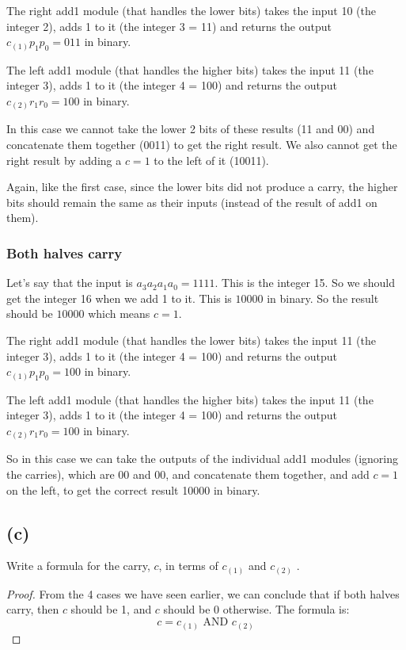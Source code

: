 \documentclass[14pt]{extarticle}
\begin{document}
The right add1 module (that handles the lower bits) takes the input 10 (the integer 2), adds 1 to it (the integer 3 = 11) and returns the output $c_{(1)}p_1p_0 = 011$ in binary.

The left add1 module (that handles the higher bits) takes the input 11 (the integer 3), adds 1 to it (the integer 4 = 100) and returns the output $c_{(2)}r_1r_0 = 100$ in binary.

In this case we cannot take the lower 2 bits of these results (11 and 00) and concatenate them together (0011) to get the right result. We also cannot get the right result by adding a $c = 1$ to the left of it (10011). 

Again, like the first case, since the lower bits did not produce a carry, the higher bits should remain the same as their inputs (instead of the result of add1 on them).

\subsubsection{Both halves carry}
Let's say that the input is $a_3a_2a_1a_0 = 1111$. This is the integer 15. So we should get the integer 16 when we add 1 to it. This is $10000$ in binary. So the result should be $10000$ which means $c = 1$.

The right add1 module (that handles the lower bits) takes the input 11 (the integer 3), adds 1 to it (the integer 4 = 100) and returns the output $c_{(1)}p_1p_0 = 100$ in binary.

The left add1 module (that handles the higher bits) takes the input 11 (the integer 3), adds 1 to it (the integer 4 = 100) and returns the output $c_{(2)}r_1r_0 = 100$ in binary.

So in this case we can take the outputs of the individual add1 modules (ignoring the carries), which are 00 and 00, and concatenate them together, and add $c = 1$ on the left, to get the correct result 10000 in binary.

\subsection{(c)}
Write a formula for the carry, $c$, in terms of $c_{(1)}$ and $c_{(2)}$ .
\begin{proof}
From the 4 cases we have seen earlier, we can conclude that if both halves carry, then $c$ should be 1, and $c$ should be 0 otherwise. The formula is:
$$
c = c_{(1)} \text{ AND } c_{(2)}
$$
\end{proof}
\end{document}

